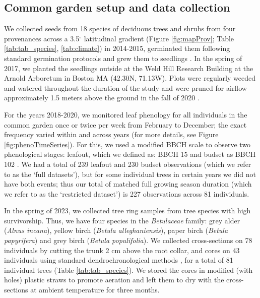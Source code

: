 \subsection{Common garden setup and data collection}
We collected seeds from 18 species of deciduous trees and shrubs from four provenances across a 3.5$^{\circ}$ latitudinal gradient (Figure \ref{fig:mapProv}; Table \ref{tab:tab_species}, \ref{tab:climate}) in 2014-2015, germinated them following standard germination protocols and grew them to seedlings \citep{baskin_seeds_2014}. In the spring of 2017, we planted the seedlings outside at the Weld Hill Research Building at the Arnold Arboretum in Boston MA (42.30\degree N, 71.13\degree W). Plots were regularly weeded and watered throughout the duration of the study and were pruned for airflow approximately 1.5 meters above the ground in the fall of 2020 \citep{buonaiuto_early_2026}. 

For the years 2018-2020, we monitored leaf phenology for all individuals in the common garden once or twice per week from February to December; the exact frequency varied within and across years (for more details, see Figure \ref{fig:phenoTimeSeries}). For this, we used a modified BBCH scale to observe two phenological stages: leafout, which we defined as: BBCH 15 and budset as BBCH 102 \citep[proposed phenophases in][]{finn_general_2007,buonaiuto_early_2026}. We had a total of 239 leafout and 230 budset observations (which we refer to as the `full datasets'), but for some individual trees in certain years we did not have both events; thus our total of matched full growing season duration (which we refer to as the `restricted dataset') is 227 observations across 81 individuals.  

In the spring of 2023, we collected tree ring samples from tree species with high survivorship. Thus, we have four species in the \textit{Betulaceae} family: grey alder (\textit{Alnus incana}), yellow birch (\textit{Betula alleghaniensis}), paper birch (\textit{Betula papyrifera}) and grey birch (\textit{Betula populifolia}). We collected cross-sections on 78 individuals by cutting the trunk 2 cm above the root collar, and cores on 43 individuals using standard dendrochronological methods \citep{cook_methods_1990}, for a total of 81 individual trees (Table \ref{tab:tab_species}). We stored the cores in modified (with holes) plastic straws to promote aeration and left them to dry with the cross-sections at ambient temperature for three months. 


